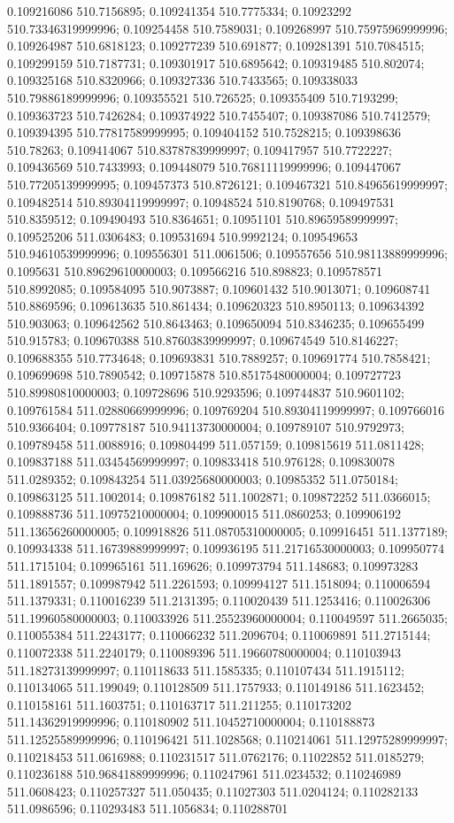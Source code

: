 0.109216086 510.7156895; 0.109241354 510.7775334; 0.10923292 510.73346319999996; 0.109254458 510.7589031; 0.109268997 510.75975969999996; 0.109264987 510.6818123; 0.109277239 510.691877; 0.109281391 510.7084515; 0.109299159 510.7187731; 0.109301917 510.6895642; 0.109319485 510.802074; 0.109325168 510.8320966; 0.109327336 510.7433565; 0.109338033 510.79886189999996; 0.109355521 510.726525; 0.109355409 510.7193299; 0.109363723 510.7426284; 0.109374922 510.7455407; 0.109387086 510.7412579; 0.109394395 510.77817589999995; 0.109404152 510.7528215; 0.109398636 510.78263; 0.109414067 510.83787839999997; 0.109417957 510.7722227; 0.109436569 510.7433993; 0.109448079 510.76811119999996; 0.109447067 510.77205139999995; 0.109457373 510.8726121; 0.109467321 510.84965619999997; 0.109482514 510.89304119999997; 0.10948524 510.8190768; 0.109497531 510.8359512; 0.109490493 510.8364651; 0.10951101 510.89659589999997; 0.109525206 511.0306483; 0.109531694 510.9992124; 0.109549653 510.94610539999996; 0.109556301 511.0061506; 0.109557656 510.98113889999996; 0.1095631 510.89629610000003; 0.109566216 510.898823; 0.109578571 510.8992085; 0.109584095 510.9073887; 0.109601432 510.9013071; 0.109608741 510.8869596; 0.109613635 510.861434; 0.109620323 510.8950113; 0.109634392 510.903063; 0.109642562 510.8643463; 0.109650094 510.8346235; 0.109655499 510.915783; 0.109670388 510.87603839999997; 0.109674549 510.8146227; 0.109688355 510.7734648; 0.109693831 510.7889257; 0.109691774 510.7858421; 0.109699698 510.7890542; 0.109715878 510.85175480000004; 0.109727723 510.89980810000003; 0.109728696 510.9293596; 0.109744837 510.9601102; 0.109761584 511.02880669999996; 0.109769204 510.89304119999997; 0.109766016 510.9366404; 0.109778187 510.94113730000004; 0.109789107 510.9792973; 0.109789458 511.0088916; 0.109804499 511.057159; 0.109815619 511.0811428; 0.109837188 511.03454569999997; 0.109833418 510.976128; 0.109830078 511.0289352; 0.109843254 511.03925680000003; 0.10985352 511.0750184; 0.109863125 511.1002014; 0.109876182 511.1002871; 0.109872252 511.0366015; 0.109888736 511.10975210000004; 0.109900015 511.0860253; 0.109906192 511.13656260000005; 0.109918826 511.08705310000005; 0.109916451 511.1377189; 0.109934338 511.16739889999997; 0.109936195 511.21716530000003; 0.109950774 511.1715104; 0.109965161 511.169626; 0.109973794 511.148683; 0.109973283 511.1891557; 0.109987942 511.2261593; 0.109994127 511.1518094; 0.110006594 511.1379331; 0.110016239 511.2131395; 0.110020439 511.1253416; 0.110026306 511.19960580000003; 0.110033926 511.25523960000004; 0.110049597 511.2665035; 0.110055384 511.2243177; 0.110066232 511.2096704; 0.110069891 511.2715144; 0.110072338 511.2240179; 0.110089396 511.19660780000004; 0.110103943 511.18273139999997; 0.110118633 511.1585335; 0.110107434 511.1915112; 0.110134065 511.199049; 0.110128509 511.1757933; 0.110149186 511.1623452; 0.110158161 511.1603751; 0.110163717 511.211255; 0.110173202 511.14362919999996; 0.110180902 511.10452710000004; 0.110188873 511.12525589999996; 0.110196421 511.1028568; 0.110214061 511.12975289999997; 0.110218453 511.0616988; 0.110231517 511.0762176; 0.11022852 511.0185279; 0.110236188 510.96841889999996; 0.110247961 511.0234532; 0.110246989 511.0608423; 0.110257327 511.050435; 0.11027303 511.0204124; 0.110282133 511.0986596; 0.110293483 511.1056834; 0.110288701 